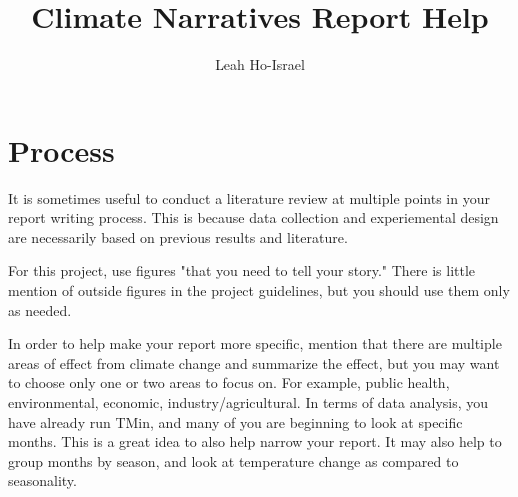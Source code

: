 \documentclass{article}\usepackage[]{graphicx}\usepackage[]{color}
\title{Climate Narratives Report Help}
\author{Leah Ho-Israel}
\begin{document}
\maketitle

\section{Process}
It is sometimes useful to conduct a literature review at multiple points in your report writing process. This is because data collection and experiemental design are necessarily based on previous results and literature.

For this project, use figures "that you need to tell your story." There is little mention of outside figures in the project guidelines, but you should use them only as needed. 

In order to help make your report more specific, mention that there are multiple areas of effect from climate change and summarize the effect, but you may want to choose only one or two areas to focus on. For example, public health, environmental, economic, industry/agricultural. 
In terms of data analysis, you have already run TMin, and many of you are beginning to look at specific months. This is a great idea to also help narrow your report. It may also help to group months by season, and look at temperature change as compared to seasonality.
\end{document}
